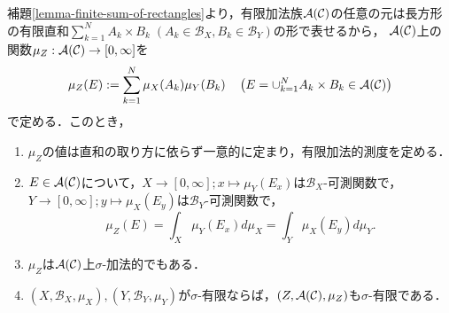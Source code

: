 \documentclass[uplatex, dvipdfmx]{jsreport}
\renewcommand{\B}{\mathcal{B}}
\begin{document}
\begin{lemma}[直積測度の積分表示]\label{lemma-integral-expression-of-product-measure}
    補題\ref{lemma-finite-sum-of-rectangles}より，有限加法族$\mathcal{A}(\mathcal{C})$の任意の元は長方形の有限直和$\sum_{k=1}^NA_k\times B_k\;(A_k\in\B_X,B_k\in\B_Y)$の形で表せるから，
    $\mathcal{A}(\mathcal{C})$上の関数$\mu_Z:\mathcal{A}(\mathcal{C})\to[0,\infty]$を\[\mu_Z(E):=\sum_{k=1}^N\mu_X(A_k)\mu_Y(B_k)\quad\left(E=\cup_{k=1}^NA_k\times B_k\in\mathcal{A}(\mathcal{C})\right)\]
    で定める．このとき，
    \begin{enumerate}
        \item $\mu_Z$の値は直和の取り方に依らず一意的に定まり，有限加法的測度を定める．
        \item $E\in\mathcal{A}(\mathcal{C})$について，$X\to[0,\infty];x\mapsto\mu_Y(E_x)$は$\B_X$-可測関数で，$Y\to[0,\infty];y\mapsto\mu_X(E_y)$は$\B_Y$-可測関数で，
        \[\mu_Z(E)=\int_X\mu_Y(E_x)d\mu_X=\int_Y\mu_X(E_y)d\mu_Y.\]
        \item $\mu_Z$は$\mathcal{A}(\mathcal{C})$上$\sigma$-加法的でもある．
        \item $(X,\B_X,\mu_X),(Y,\B_Y,\mu_Y)$が$\sigma$-有限ならば，$(Z,\mathcal{A}(\mathcal{C}),\mu_Z)$も$\sigma$-有限である．
    \end{enumerate}
\end{lemma}
\end{document}
